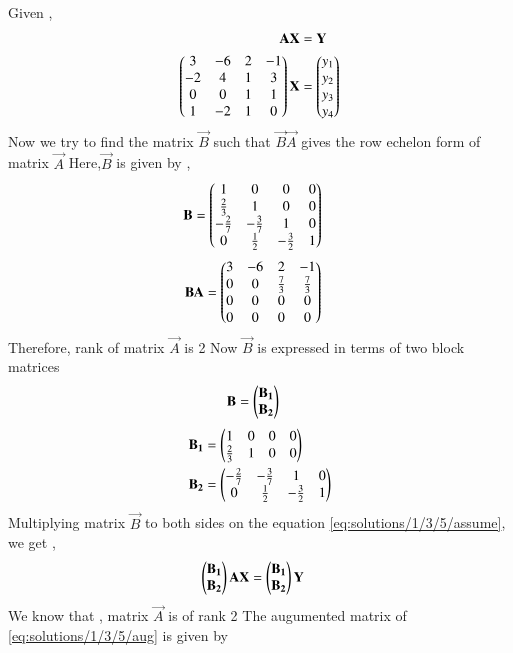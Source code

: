Given , 
\begin{align}
    \mathbf{A}\mathbf{X}&=\mathbf{Y}\label{eq:solutions/1/3/5/assume}\\
    \begin{pmatrix}3 & -6 & 2 & -1\\-2 & 4 & 1 & 3\\0 & 0 & 1& 1\\1 & -2 & 1 & 0\end{pmatrix}\mathbf{X}&=\begin{pmatrix}y_1 \\y_2\\y_3\\y_4\end{pmatrix}\label{eq:solutions/1/3/5/given}
\end{align}
Now we try to find the matrix $\vec{B}$ such that $\vec{B}\vec{A}$ gives the row echelon form of matrix $\vec{A}$
Here,$\vec{B}$ is given by , 
\begin{align}
    \mathbf{B}&=\begin{pmatrix}1&0&0&0\\\frac{2}{3}&1&0&0\\-\frac{2}{7}&-\frac{3}{7}&1&0\\0&\frac{1}{2}&-\frac{3}{2}&1\end{pmatrix}
\end{align}
\begin{align}
    \mathbf{B}\mathbf{A}&=\begin{pmatrix}3 & -6 & 2 & -1\\0 & 0 & \frac{7}{3} & \frac{7}{3}\\0 & 0 & 0& 0\\0 & 0 & 0 & 0\end{pmatrix}\label{eq:solutions/1/3/5/ref3}
\end{align}
Therefore, rank of matrix $\vec{A}$ is 2
Now $\vec{B}$ is expressed in terms of two block matrices
\begin{align}
    \mathbf{B}&=\begin{pmatrix}\mathbf{B_1}\\\mathbf{B_2}\end{pmatrix}
\end{align}
\begin{align}
    \mathbf{B_1}&=\begin{pmatrix}1&0&0&0\\\frac{2}{3}&1&0&0\end{pmatrix}\\
    \mathbf{B_2}&=\begin{pmatrix}-\frac{2}{7}&-\frac{3}{7}&1&0\\0&\frac{1}{2}&-\frac{3}{2}&1\end{pmatrix}
\end{align}
Multiplying matrix $\vec{B}$ to both sides on the equation \eqref{eq:solutions/1/3/5/assume}, we get , 
\begin{align}
    \begin{pmatrix}\mathbf{B_1}\\\mathbf{B_2}\end{pmatrix}\mathbf{A}\mathbf{X}&=\begin{pmatrix}\mathbf{B_1}\\\mathbf{B_2}\end{pmatrix}\mathbf{Y}\label{eq:solutions/1/3/5/aug}
\end{align}
We know that , matrix $\vec{A}$ is of rank 2 
The augumented matrix of \eqref{eq:solutions/1/3/5/aug} is given by 
